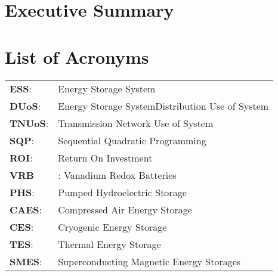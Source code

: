 \documentclass[fontsize=9.5pt]{extarticle}
\begin{document}
\newpage


\section*{Executive Summary}\label{ExecSummary}

\newpage

\tableofcontents


\newpage
{}
\listoffigures
{}
\listoftables
{}
\section*{List of Acronyms}\label{acronyms}
\begin{tabular}{p{1cm}p{12cm}}
\textbf{ESS}:& Energy Storage System \\
\textbf{DUoS}:& Energy Storage SystemDistribution Use of System\\
\textbf{TNUoS}:& Transmission Network Use of System\\
\textbf{SQP}:& Sequential Quadratic Programming\\
\textbf{ROI}:& Return On Investment\\
\textbf{VRB}&: Vanadium Redox Batteries\\
\textbf{PHS}:& Pumped Hydroelectric Storage\\
\textbf{CAES}:& Compressed Air Energy Storage\\
\textbf{CES}:& Cryogenic Energy Storage\\
\textbf{TES}:& Thermal Energy Storage\\
\textbf{SMES}:& Superconducting Magnetic Energy Storages\\
\end{tabular}

\newpage
\end{document}
